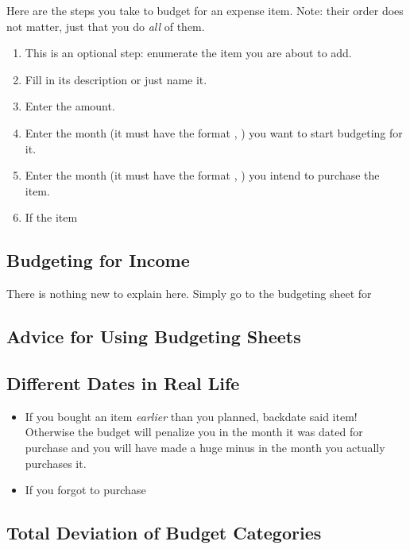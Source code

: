 Here are the steps you take to budget for an expense item.
Note: their order does not matter, just that you do \emph{all} of them.
\begin{enumerate}
	\item This is an optional step: enumerate the item you are about to add.
	\item Fill in its description or just name it.
	\item Enter the amount.
	\item Enter the month (it must have the format , \eg {}) you want to start budgeting for it.
	\item Enter the month (it must have the format , \eg {}) you intend to purchase the item.
	\item If the item 
\end{enumerate}

\subsection{Budgeting for Income}
\label{subsec:budgeting-income}

There is nothing new to explain here.
Simply go to the budgeting sheet for 

\subsection{Advice for Using Budgeting Sheets}
\label{subsec:advice-budgeting-sheets}

\subsection{Different Dates in Real Life}
\label{subsec:Different-Dates}

\begin{itemize}
	\item If you bought an item \emph{earlier} than you planned, backdate said item! Otherwise the budget will penalize you in the month it was dated for purchase and you will have made a huge minus in the month you actually purchases it.
	\item If you forgot to purchase 
\end{itemize}

\subsection{Total Deviation of Budget Categories}
\label{subsec:Total-Deviation}

